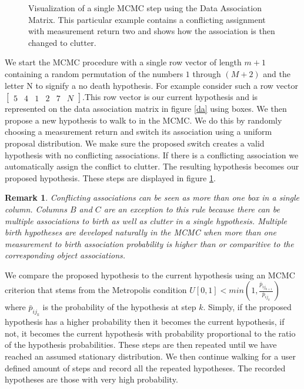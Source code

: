 \documentclass[10pt, conference]{IEEEtran}
\newtheorem{remark}{Remark}
\begin{document}
\begin{figure}[h]
\centering
{}
\caption{Visualization of a single MCMC step using the Data Association Matrix. This particular example contains a conflicting assignment with measurement return two and shows how the association is then changed to clutter.}
\label{da2}
\end{figure}
We start the MCMC procedure with a single row vector of length $m+1$ containing a random permutation of the numbers $1$ through $(M+2)$ and the letter N to signify a no death hypothesis. For example consider such a row vector $\left[ \begin{smallmatrix} 5&4&1&2&7&N \end{smallmatrix} \right]$.This row vector is our current hypothesis and is represented on the data association matrix in figure \ref{da} using boxes. We then propose a new hypothesis to walk to in the MCMC. We do this by randomly choosing a measurement return and switch its association using a uniform proposal distribution. We make sure the proposed switch creates a valid hypothesis with no conflicting associations. If there is a conflicting association we automatically assign the conflict to clutter. The resulting hypothesis becomes our proposed hypothesis. These steps are displayed in figure \ref{da2}.
\begin{remark}
Conflicting associations can be seen as more than one box in a single column. Columns $B$ and $C$ are an exception to this rule because there can be multiple associations to birth as well as clutter in a single hypothesis. Multiple birth hypotheses are developed naturally in the MCMC when more than one measurement to birth association probability is higher than or comparitive to the corresponding object associations. 
\end{remark}
We compare the proposed hypothesis to the current hypothesis using an MCMC criterion that stems from the Metropolis condition $U[0,1]< min( 1, \frac{\bar{p}_{ij_{k+1}}}{\bar{p}_{ij_{k}}})$ where $\bar{p}_{ij_{k}}$ is the probability of the hypothesis at step $k$. Simply, if the proposed hypothesis has a higher probability then it becomes the current hypothesis, if not, it becomes the current hypothesis with probability proportional to the ratio of the hypothesis probabilities. These steps are then repeated until we have reached an assumed stationary distribution. We then continue walking for a user defined amount of steps and record all the repeated hypotheses. The recorded hypotheses are those with very high probability.
\end{document}
